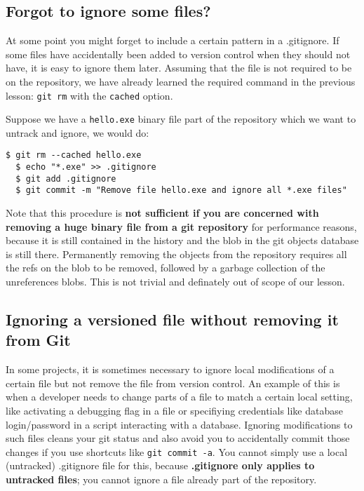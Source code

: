 \documentclass[a4paper]{../../common/tufte-latex/tufte-handout}
\begin{document}
\subsection{Forgot to ignore some files?}
At some point you might forget to include a certain pattern in a .gitignore.
If some files have accidentally been added to version control when they should not have, it is easy to ignore them later.
Assuming that the file is not required to be on the repository, we have already learned the required command in the previous lesson: \texttt{git rm} with the \texttt{cached} option.

Suppose we have a \texttt{hello.exe} binary file part of the repository which we want to untrack and ignore, we would do:
\begin{lstlisting}[style=BashInputStyle]
  $ git rm --cached hello.exe
  $ echo "*.exe" >> .gitignore
  $ git add .gitignore
  $ git commit -m "Remove file hello.exe and ignore all *.exe files"
\end{lstlisting}

Note that this procedure is \textbf{not sufficient if you are concerned with removing a huge binary file from a git repository} for performance reasons, because it is still contained in the history and the blob in the git objects database is still there.
Permanently removing the objects from the repository requires all the refs on the blob to be removed, followed by a garbage collection of the unreferences blobs.
This is not trivial and definately out of scope of our lesson.

\subsection{Ignoring a versioned file without removing it from Git}
In some projects, it is sometimes necessary to ignore local modifications of a certain file but not remove the file from version control.
An example of this is when a developer needs to change parts of a file to match a certain local setting, like activating a debugging flag in a file or specifiying credentials like database login/password in a script interacting with a database.
Ignoring modifications to such files cleans your git status and also avoid you to accidentally commit those changes if you use shortcuts like \texttt{git commit -a}.
You cannot simply use a local (untracked) .gitignore file for this, because \textbf{.gitignore only applies to untracked files}; you cannot ignore a file already part of the repository.
\end{document}

